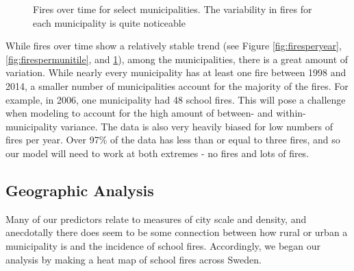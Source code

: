 \documentclass[10pt,a4paper, hidelinks]{article} %
\begin{document}
\begin{figure}[H]
\begin{minipage}[c]{0.7\textwidth}
	\end{minipage} \hfill
	\begin{minipage}[l]{0.29\textwidth}
		\caption{Fires over time for select municipalities. The variability in fires for each municipality is quite noticeable}
		\label{fig:firespermuni}
	\end{minipage}
\end{figure}


While fires over time show a relatively stable trend (see Figure \ref{fig:firesperyear}, \ref{fig:firespermunitile}, and \ref{fig:firespermuni}), among the municipalities, there is a great amount of variation. While nearly every municipality has at least one fire between 1998 and 2014, a smaller number of municipalities account for the majority of the fires. For example, in 2006, one municipality had 48 school fires. This will pose a challenge when modeling to account for the high amount of between- and within- municipality variance. The data is also very heavily biased for low numbers of fires per year. Over 97\% of the data has less than or equal to three fires, and so our model will need to work at both extremes - no fires and lots of fires. 

\subsection{Geographic Analysis}

Many of our predictors relate to measures of city scale and density, and anecdotally there does seem to be some connection between how rural or urban a municipality is and the incidence of school fires.  Accordingly, we began our analysis by making a heat map of school fires across Sweden. \\
\end{document}
